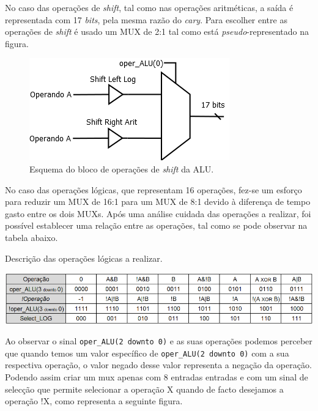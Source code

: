 \documentclass[11pt]{article}
\numberwithin{equation}{section}
\begin{document}
No caso das operações de \textit{shift}, tal como nas operações aritméticas, a saída é representada com 17 \textit{bits}, pela mesma razão do \textit{cary}. Para escolher entre as operações de \textit{shift} é usado um MUX de 2:1 tal como está \textit{pseudo}-representado na figura.

\begin{figure}[H]
	\centering
	\includegraphics[keepaspectratio=true, scale=0.55]{imagens/Shift}
	\caption{Esquema do bloco de operações de \textit{shift} da ALU.}
	\vspace{-0.8em}
\end{figure}

No caso das operações lógicas, que representam 16 operações, fez-se um esforço para reduzir um MUX de 16:1 para um MUX de 8:1 devido à diferença de tempo gasto entre os dois MUXs. Após uma análise cuidada das operações a realizar, foi possível establecer uma relação entre as operações, tal como se pode observar na tabela abaixo.

\begin{table}[h]
	\centering
	\caption{Descrição das operações lógicas a realizar.}
	\vspace{-2mm}
 	\includegraphics[keepaspectratio=true, scale=0.35]{tabelas/MUX8-1}
\end{table}

Ao observar o sinal \texttt{oper\_ALU(2 {\footnotesize downto} 0)} e as suas operações podemos perceber que quando temos um valor específico de \texttt{oper\_ALU(2 {\footnotesize downto} 0)} com a sua respectiva operação, o valor negado desse valor representa a negação da operação. Podendo assim criar um mux apenas com 8 entradas entradas e com um sinal de selecção que permite selecionar a operação X quando de facto desejamos a operação !X, como representa a seguinte figura.
\end{document}
